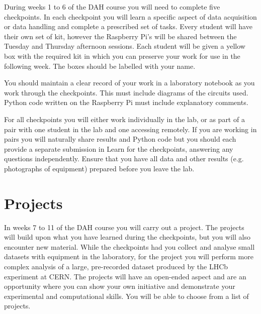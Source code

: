 During weeks 1 to 6 of the DAH course you will need to complete five checkpoints. %
In each checkpoint you will learn a specific aspect of data acquisition or data handling and complete a prescribed set of tasks.
Every student will have their own set of kit, however the Raspberry Pi's will be shared between the Tuesday and Thursday afternoon sessions.
Each student will be given a yellow box with the required kit in which you can preserve your work for use in the following week.
The boxes should be labelled with your name.

You should maintain a clear record of your work in a laboratory notebook as you work through the checkpoints.
This must include diagrams of the circuits used.
Python code written on the Raspberry Pi must include explanatory comments. %

For all checkpoints you will either work individually in the lab, or as part of a pair with one student in the lab and one accessing remotely.
If you are working in pairs you will naturally share results and Python code but you should each provide a separate submission in Learn for the checkpoints, answering any questions independently.
Ensure that you have all data and other results (e.g. photographs of equipment) prepared before you leave the lab.

\section{Projects}

In weeks 7 to 11 of the DAH course you will carry out a project. %
The projects will build upon what you have learned during the checkpoints, but you will also encounter new material.
While the checkpoints had you collect and analyse small datasets with equipment in the laboratory, for the project you will perform more complex analysis of a large, pre-recorded dataset produced by the LHCb experiment at CERN.
The projects will have an open-ended aspect and are an opportunity where you can show your own initiative and demonstrate your experimental and computational skills. 
You will be able to choose from a list of projects. %

